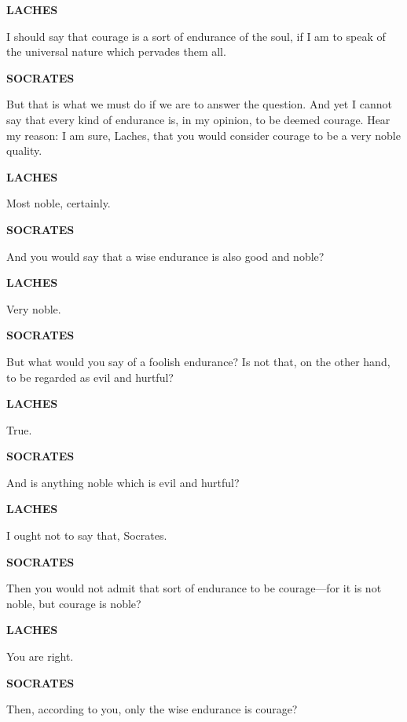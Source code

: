 \documentclass[11pt,letter]{article}
\begin{document}
\par \textbf{LACHES}
\par   I should say that courage is a sort of endurance of the soul, if I am to speak of the universal nature which pervades them all.

\par \textbf{SOCRATES}
\par   But that is what we must do if we are to answer the question. And yet I cannot say that every kind of endurance is, in my opinion, to be deemed courage. Hear my reason:  I am sure, Laches, that you would consider courage to be a very noble quality.

\par \textbf{LACHES}
\par   Most noble, certainly.

\par \textbf{SOCRATES}
\par   And you would say that a wise endurance is also good and noble?

\par \textbf{LACHES}
\par   Very noble.

\par \textbf{SOCRATES}
\par   But what would you say of a foolish endurance? Is not that, on the other hand, to be regarded as evil and hurtful?

\par \textbf{LACHES}
\par   True.

\par \textbf{SOCRATES}
\par   And is anything noble which is evil and hurtful?

\par \textbf{LACHES}
\par   I ought not to say that, Socrates.

\par \textbf{SOCRATES}
\par   Then you would not admit that sort of endurance to be courage—for it is not noble, but courage is noble?

\par \textbf{LACHES}
\par   You are right.

\par \textbf{SOCRATES}
\par   Then, according to you, only the wise endurance is courage?
\end{document}
